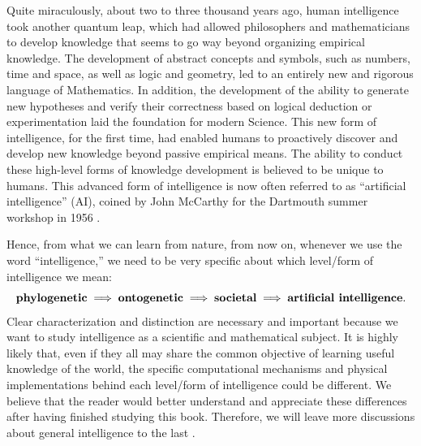 \documentclass[../../book-main.tex]{subfiles}
\begin{document}
Quite miraculously, about two to three  thousand years ago, human intelligence took another quantum leap, which had allowed philosophers and mathematicians to develop knowledge that seems to go way beyond organizing empirical knowledge. The development of abstract concepts and symbols, such as numbers, time and space, as well as logic and geometry, led to an entirely new and rigorous language of Mathematics. In addition, the development of the ability to generate new hypotheses and verify their correctness based on logical deduction or experimentation laid the foundation for modern Science. This new form of intelligence, for the first time, had enabled humans to proactively discover and develop new knowledge beyond passive empirical means. The ability to conduct these high-level forms of knowledge development is believed to be unique to humans. This advanced form of intelligence is now often referred to as  ``artificial intelligence'' (AI), coined by John McCarthy for the Dartmouth summer workshop in 1956 \cite{McCarthy-1955}. 

Hence, from what we can learn from nature, from now on, whenever we use the word ``intelligence,'' we need to be very specific about which level/form of intelligence we mean:
\begin{equation}
\mbox{\textbf{phylogenetic}} \;
   \Longrightarrow \; \mbox{\textbf{ontogenetic}} \; \Longrightarrow \; 
   \mbox{\textbf{societal}}
   \; \Longrightarrow \; 
   \mbox{\textbf{artificial intelligence}}.
\end{equation}
Clear characterization and distinction are necessary and important because we want to study intelligence as a scientific and mathematical subject. It is highly likely that, even if they all may share the common objective of learning useful knowledge of the world, the specific computational mechanisms and physical implementations behind each level/form of intelligence could be different. We believe that the reader would better understand and appreciate these differences after having finished studying this book. Therefore, we will leave more discussions about general intelligence to the last .
\end{document}
